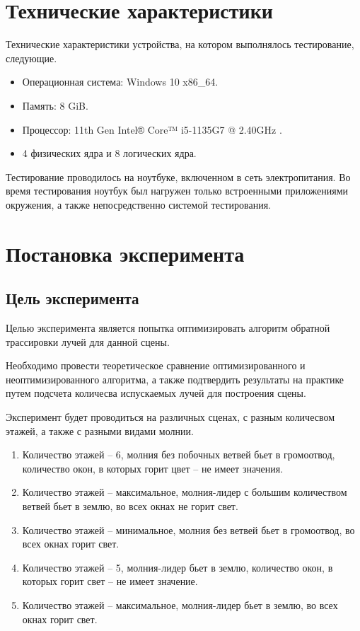 \section{Технические характеристики}

Технические характеристики устройства, на котором выполнялось тестирование, следующие.

\begin{itemize}
	\item Операционная система: Windows 10 \cite{oswind} x86\_64.
	\item Память: 8 GiB.
	\item Процессор: 11th Gen Intel® Core™ i5-1135G7 @ 2.40GHz \cite{intel}.
	\item 4 физических ядра и 8 логических ядра.
\end{itemize}

Тестирование проводилось на ноутбуке, включенном в сеть электропитания. Во время тестирования ноутбук был нагружен только встроенными приложениями окружения, а также непосредственно системой тестирования.


\section{Постановка эксперимента} 

\subsection{Цель эксперимента}
Целью эксперимента является попытка оптимизировать алгоритм обратной трассировки лучей для данной сцены. 

Необходимо провести теоретическое сравнение оптимизированного и неоптимизированного алгоритма, а также подтвердить результаты на практике путем подсчета количесва испускаемых лучей для построения сцены.

Эксперимент будет проводиться на различных сценах, с разным количесвом этажей, а также с разными видами молнии.
\begin{enumerate}
	\item Количество этажей -- 6, молния без побочных ветвей бьет в громоотвод, количество окон, в которых горит цвет -- не имеет значения.
	\item Количество этажей -- максимальное, молния-лидер с большим количеством ветвей бьет в землю, во всех окнах не горит свет.
	\item Количество этажей -- минимальное, молния без ветвей бьет в громоотвод, во всех окнах горит свет. 
	\item Количество этажей -- 5, молния-лидер бьет в землю, количество окон, в которых горит свет -- не имеет значение.
	\item Количество этажей -- максимальное, молния-лидер бьет в землю, во всех окнах горит свет.
\end{enumerate}

